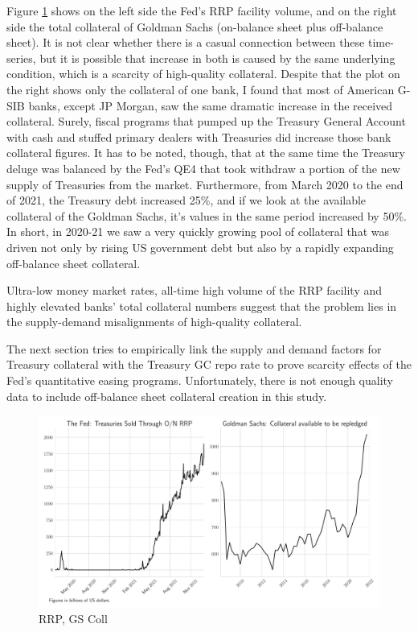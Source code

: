 \documentclass[11pt,a4paper,english,oneside]{article}
\begin{document}
Figure \ref{fig:rrp+coll} shows on the left side the Fed's RRP facility volume, and on the right side the total collateral of Goldman Sachs (on-balance sheet plus off-balance sheet). It is not clear whether there is a casual connection between these time-series, but it is possible that increase in both is caused by the same underlying condition, which is a scarcity of high-quality collateral. Despite that the plot on the right shows only the collateral of one bank, I found that most of American G-SIB  banks, except JP Morgan, saw the same dramatic increase in the received collateral. Surely, fiscal programs that pumped up the Treasury General Account with cash and stuffed primary dealers with Treasuries did increase those bank collateral figures. It has to be noted, though, that at the same time the Treasury deluge was balanced by the Fed's QE4 that took withdraw a portion of the new supply of Treasuries from the market. Furthermore, from March 2020 to the end of 2021, the Treasury debt increased 25\%, and if we look at the available collateral of the Goldman Sachs, it's values in the same period increased by 50\%. In short, in 2020-21 we saw a very quickly growing pool of collateral that was driven not only by rising US government debt but also by a rapidly expanding off-balance sheet collateral.

Ultra-low money market rates, all-time high volume of the RRP facility and highly elevated banks' total collateral numbers suggest that the problem lies in the supply-demand misalignments of high-quality collateral.

The next section tries to empirically link the supply and demand factors for Treasury collateral with the Treasury GC repo rate to prove scarcity effects of the Fed's quantitative easing programs. Unfortunately, there is not enough quality data to include off-balance sheet collateral creation in this study.

\begin{figure}[htb!]
  \begin{center}
    \caption{RRP, GS Coll}
    \includegraphics[width=0.99\linewidth]{rrp+coll.pdf}
  \end{center}
  \label{fig:rrp+coll}
\end{figure}
\end{document}
